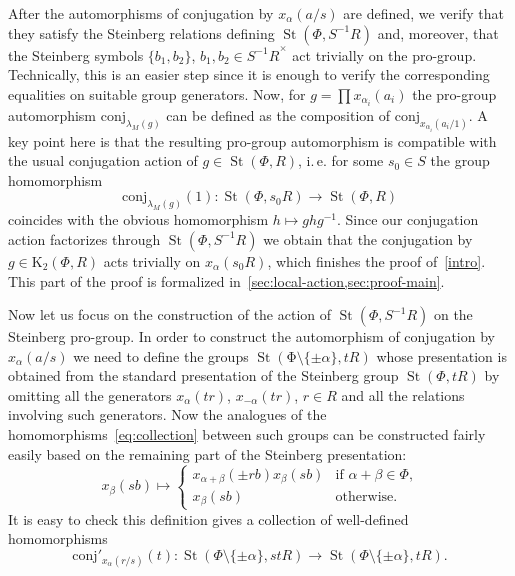\documentclass[oneside, 11pt]{amsart}
\numberwithin{equation}{section}
\theoremstyle{definition}
\theoremstyle{remark}
\DeclareMathOperator\St{St}
\begin{document}
After the automorphisms of conjugation by $x_\alpha(a/s)$ are defined, we verify that they satisfy the Steinberg relations defining $\St(\Phi, S^{-1}R)$ and, moreover, that the Steinberg symbols $\{b_1, b_2\}$, $b_1, b_2 \in {S^{-1}R}^\times$ act trivially on the pro-group. Technically, this is an easier step since it is enough to verify the corresponding equalities on suitable group generators.
Now, for $g = \prod x_{\alpha_i}(a_i)$ the pro-group automorphism $\mathrm{conj}_{\lambda_M(g)}$ can be defined as the composition of $\mathrm{conj}_{x_{\alpha_i}(a_i/1)}$.
A key point here is that the resulting pro-group automorphism is compatible with the usual conjugation action of $g \in \St(\Phi, R)$, i.\,e. for some $s_0 \in S$ the group homomorphism \[\mathrm{conj}_{\lambda_M(g)}(1) \colon \St(\Phi, s_0R) \to \St(\Phi, R)\] coincides with the obvious homomorphism $h \mapsto ghg^{-1}$. Since our conjugation action factorizes through $\St(\Phi, S^{-1}R)$ we obtain that the conjugation by $g \in \mathrm K_2(\Phi, R)$ acts trivially on $x_\alpha(s_0R)$, which finishes the proof of~\eqref{intro}. This part of the proof is formalized in~\cref{sec:local-action,sec:proof-main}.

Now let us focus on the construction of the action of $\St(\Phi, S^{-1}R)$ on the Steinberg pro-group. In order to construct the automorphism of conjugation by $x_{\alpha}(a/s)$ we need to define the groups 
$\St(\mathrm \Phi\setminus\{\pm\alpha\}, tR)$ whose presentation is obtained from the standard presentation of the Steinberg group $\St(\Phi, tR)$ by omitting all the generators $x_\alpha(tr)$, $x_{-\alpha}(tr)$, $r \in R$ and all the relations involving such generators. Now the analogues of the homomorphisms~\eqref{eq:collection} between such groups can be constructed fairly easily based on the remaining part of the Steinberg presentation:
\begin{equation} \label{eq:conj-def} x_\beta(sb) \mapsto \left\{\begin{array}{ll} x_{\alpha+\beta}(\pm rb) x_\beta(sb) & \text{if $\alpha+\beta\in\Phi$,}\\ x_\beta(sb) & \text{otherwise.}\end{array}\right. \end{equation}
It is easy to check this definition gives a collection of well-defined homomorphisms
\[\mathrm{conj}'_{x_\alpha(r/s)}(t)\colon \St(\Phi\setminus\{\pm\alpha\}, stR) \to \St(\Phi\setminus\{\pm\alpha\}, tR).\]
\end{document}
